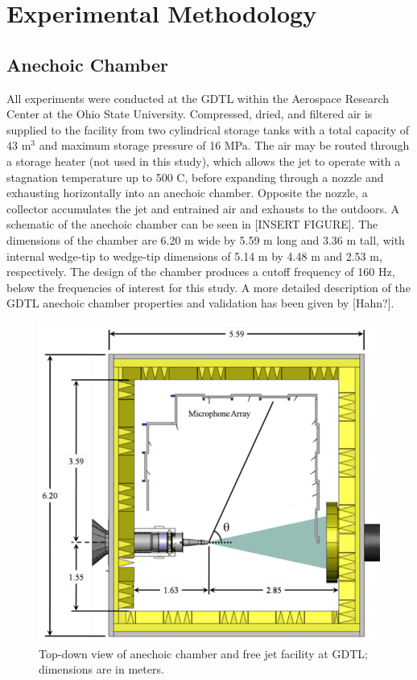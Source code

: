 \chapter{Experimental Methodology}
\label{methodology}

\section{Anechoic Chamber}
All experiments were conducted at the GDTL within the Aerospace Research Center at the Ohio State University. 
Compressed, dried, and filtered air is supplied to the facility from two cylindrical storage tanks with a total capacity of 43 m$^{3}$ and maximum storage pressure of 16 MPa.
The air may be routed through a storage heater (not used in this study), which allows the jet to operate with a stagnation temperature up to 500 C, before expanding through a nozzle and exhausting horizontally into an anechoic chamber. 
Opposite the nozzle, a collector accumulates the jet and entrained air and exhausts to the outdoors. 
A schematic of the anechoic chamber can be seen in [INSERT FIGURE]. 
The dimensions of the chamber are 6.20 m wide by 5.59 m long and 3.36 m tall, with internal wedge-tip to wedge-tip dimensions of 5.14 m by 4.48 m and 2.53 m, respectively. 
The design of the chamber produces a cutoff frequency of 160 Hz, below the frequencies of interest for this study. 
A more detailed description of the GDTL anechoic chamber properties and validation has been given by [Hahn?].
\begin{figure}
	\centering
	\includegraphics{Figures/Chamber_Schematic.png}
	\caption{Top-down view of anechoic chamber and free jet facility at GDTL; dimensions are in meters.} 
	\label{fig:chamber}
\end{figure}

